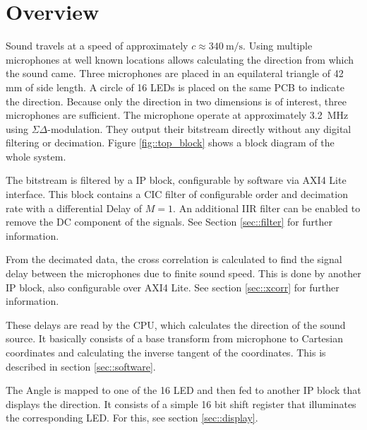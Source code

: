 \section{Overview}
Sound travels at a speed of approximately $c\approx \SI{340}{\meter\per\s}$.
Using multiple microphones at well known locations allows calculating the direction from which the sound came.
Three microphones are placed in an equilateral triangle of 42 mm of side length.
A circle of 16 LEDs is placed on the same PCB to indicate the direction.
Because only the direction in two dimensions is of interest, three microphones are sufficient.
The microphone operate at approximately \SI{3.2}{\mega\hertz} using $\Sigma\Delta$-modulation.
They output their bitstream directly without any digital filtering or decimation.
Figure \ref{fig::top_block} shows a block diagram of the whole system.

The bitstream is filtered by a IP block, configurable by software via AXI4 Lite interface.
This block contains a CIC filter of configurable order and decimation rate with a differential Delay of $M=1$.
An additional IIR filter can be enabled to remove the DC component of the signals.
See Section \ref{sec::filter} for further information.

From the decimated data, the cross correlation is calculated to find the signal delay between the microphones due to finite sound speed.
This is done by another IP block, also configurable over AXI4 Lite.
See section \ref{sec::xcorr} for further information.

These delays are read by the CPU, which calculates the direction of the sound source. 
It basically consists of a base transform from microphone to Cartesian coordinates and calculating the inverse tangent of the coordinates.
This is described in section \ref{sec::software}.

The Angle is mapped to one of the 16 LED and then fed to another IP block that displays the direction.
It consists of a simple 16 bit shift register that illuminates the corresponding LED.
For this, see section \ref{sec::display}.

